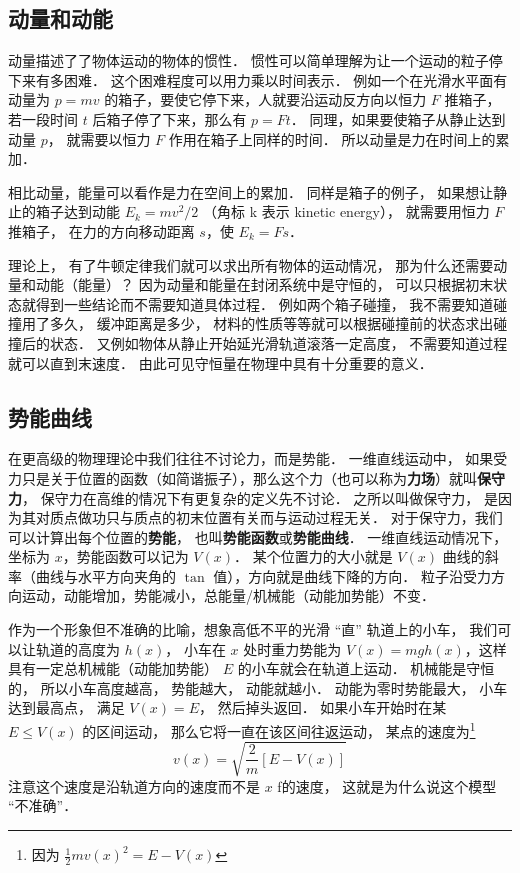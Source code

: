 

\subsection{动量和动能}
动量描述了了物体运动的物体的惯性． 惯性可以简单理解为让一个运动的粒子停下来有多困难． 这个困难程度可以用力乘以时间表示． 例如一个在光滑水平面有动量为 $p = mv$ 的箱子，要使它停下来，人就要沿运动反方向以恒力 $F$ 推箱子， 若一段时间 $t$ 后箱子停了下来，那么有 $p = Ft$．%
同理，如果要使箱子从静止达到动量 $p$， 就需要以恒力 $F$ 作用在箱子上同样的时间． 所以动量是力在时间上的累加．

相比动量，能量可以看作是力在空间上的累加． 同样是箱子的例子， 如果想让静止的箱子达到动能 $E_k = mv^2/2$ （角标 k 表示 kinetic energy）， 就需要用恒力 $F$ 推箱子， 在力的方向移动距离 $s$，使 $E_k = Fs$．

理论上， 有了牛顿定律我们就可以求出所有物体的运动情况， 那为什么还需要动量和动能（能量）？ 因为动量和能量在封闭系统中是守恒的， 可以只根据初末状态就得到一些结论而不需要知道具体过程． 例如两个箱子碰撞， 我不需要知道碰撞用了多久， 缓冲距离是多少， 材料的性质等等就可以根据碰撞前的状态求出碰撞后的状态． 又例如物体从静止开始延光滑轨道滚落一定高度， 不需要知道过程就可以直到末速度． 由此可见守恒量在物理中具有十分重要的意义．

\subsection{势能曲线}
在更高级的物理理论中我们往往不讨论力，而是势能． 一维直线运动中， 如果受力只是关于位置的函数（如简谐振子），那么这个力（也可以称为\textbf{力场}）就叫\textbf{保守力}， 保守力在高维的情况下有更复杂的定义先不讨论． 之所以叫做保守力， 是因为其对质点做功只与质点的初末位置有关而与运动过程无关． 对于保守力，我们可以计算出每个位置的\textbf{势能}， 也叫\textbf{势能函数}或\textbf{势能曲线}． 一维直线运动情况下，坐标为 $x$，势能函数可以记为 $V(x)$． 某个位置力的大小就是 $V(x)$ 曲线的斜率（曲线与水平方向夹角的 $\tan$ 值），方向就是曲线下降的方向． 粒子沿受力方向运动，动能增加，势能减小，总能量/机械能（动能加势能）不变．

作为一个形象但不准确的比喻，想象高低不平的光滑 “直” 轨道上的小车， 我们可以让轨道的高度为 $h(x)$， 小车在 $x$ 处时重力势能为 $V(x) = mgh(x)$，这样具有一定总机械能（动能加势能） $E$ 的小车就会在轨道上运动． 机械能是守恒的， 所以小车高度越高， 势能越大， 动能就越小． 动能为零时势能最大， 小车达到最高点， 满足 $V(x) = E$， 然后掉头返回． 如果小车开始时在某 $E \leq V(x)$ 的区间运动， 那么它将一直在该区间往返运动， 某点的速度为\footnote{因为 $\frac{1}{2}mv(x)^2 = E - V(x)$}
\begin{equation}
v(x) = \sqrt{\frac{2}{m}[E - V(x)]}
\end{equation}
注意这个速度是沿轨道方向的速度而不是 $x$ f的速度， 这就是为什么说这个模型 “不准确”．

